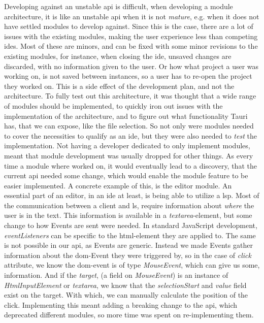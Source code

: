 Developing against an unstable \gls{api} is difficult, when developing a module
architecture, it is like an unstable \gls{api} when it is not \textit{mature},
e.g. when it does not have settled modules to develop against. Since this is
the case, there are a lot of issues with the existing modules, making the user
experience less than competing \gls{ide}s. Most of these are minors, and can be
fixed with some minor revisions to the existing modules, for instance, when
closing the \gls{ide}, unsaved changes are discarded, with no information given
to the user. Or how what project a user was working on, is not saved between
instances, so a user has to re-open the project they worked on. This is a side
effect of the development plan, and not the architecture. To fully test out this
architecture, it was thought that a wide range of modules should be implemented,
to quickly iron out issues with the implementation of the architecture, and to
figure out what functionality Tauri has, that we can expose, like the file
selection.
So not only were modules needed to cover the necessities to qualify as an
\gls{ide}, but they were also needed to \textit{test} the implementation. Not
having a developer dedicated to only implement modules, meant that module
development was usually dropped for other things. As every time a module where
worked on, it would eventually lead to a discovery, that the current \gls{api}
needed some change, which would enable the module feature to be easier
implemented. A concrete example of this, is the editor module.
An essential part of an editor, in an \gls{ide} at least, is being able to
utilize a \gls{lsp}. Most of the communication between a client and \gls{ls},
require information about \textit{where} the user is in the text. This
information is available in a \textit{textarea}-element, but some change to how
Events are sent were needed. In standard JavaScript development,
\textit{eventListeners} can be specific to the \gls{html}-element they are
applied to. The same is not possible in our \gls{api}, as Events are generic.
Instead we made Events gather information about the \gls{dom}-Event they were
triggered by, so in the case of \textit{click} attribute, we know the
\gls{dom}-event is of type \textit{MouseEvent}, which can give us some,
information. And if the \textit{target}, (a field on \textit{MouseEvent}) is an
instance of \textit{HtmlInputElement} or \textit{textarea}, we know that the
\textit{selectionStart} and \textit{value} field exist on the target. With
which, we can manually calculate the position of the click. Implementing this
meant adding a breaking change to the \gls{api}, which deprecated different
modules, so more time was spent on re-implementing them.

